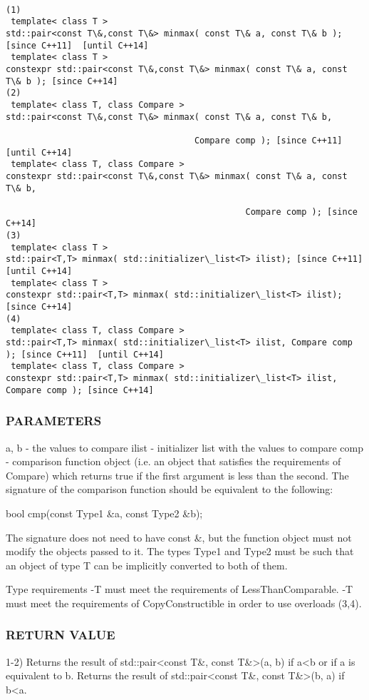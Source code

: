 \begin{lstlisting}

(1)
 template< class T >
std::pair<const T\&,const T\&> minmax( const T\& a, const T\& b ); [since C++11]  [until C++14]
 template< class T >
constexpr std::pair<const T\&,const T\&> minmax( const T\& a, const T\& b ); [since C++14]
(2)
 template< class T, class Compare >
std::pair<const T\&,const T\&> minmax( const T\& a, const T\& b,

                                     Compare comp ); [since C++11]  [until C++14]
 template< class T, class Compare >
constexpr std::pair<const T\&,const T\&> minmax( const T\& a, const T\& b,

                                               Compare comp ); [since C++14]
(3)
 template< class T >
std::pair<T,T> minmax( std::initializer\_list<T> ilist); [since C++11]  [until C++14]
 template< class T >
constexpr std::pair<T,T> minmax( std::initializer\_list<T> ilist); [since C++14]
(4)
 template< class T, class Compare >
std::pair<T,T> minmax( std::initializer\_list<T> ilist, Compare comp ); [since C++11]  [until C++14]
 template< class T, class Compare >
constexpr std::pair<T,T> minmax( std::initializer\_list<T> ilist, Compare comp ); [since C++14]
\end{lstlisting}

\subsubsection{PARAMETERS}
a, b - the values to compare
ilist - initializer list with the values to compare
comp - comparison function object (i.e. an object that satisfies the requirements of Compare) which returns true if the first argument is less than the second.
The signature of the comparison function should be equivalent to the following:

 bool cmp(const Type1 \&a, const Type2 \&b);

The signature does not need to have const \&, but the function object must not modify the objects passed to it.
The types Type1 and Type2 must be such that an object of type T can be implicitly converted to both of them.

 Type requirements
 -T must meet the requirements of LessThanComparable.
 -T must meet the requirements of CopyConstructible in order to use overloads (3,4).

\subsubsection{RETURN VALUE}
1-2) Returns the result of std::pair<const T\&, const T\&>(a, b) if a<b or if a is equivalent to b. Returns the result of std::pair<const T\&, const T\&>(b, a) if b<a.

